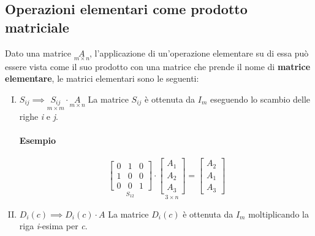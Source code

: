 		\subsection{Operazioni elementari come prodotto matriciale}
			Dato una matrice $ \underset{m \times n}{A} $, l'applicazione di un'operazione elementare su di essa può essere vista come il suo prodotto con una matrice che prende il nome di \textbf{matrice elementare}, le matrici elementari sono le seguenti:
			\begin{enumerate}[(I)]
				\item $ S_{ij} \implies \underset{m \times m}{S_{ij}} \cdot \underset{m \times n}{A} $ \newline
				La matrice $S_{ij}$ è ottenuta da $I_m$ eseguendo lo scambio delle righe \textit{i} e \textit{j}.
				\begin{GrayBox}
					\paragraph{Esempio}
					$$
					\underset{S_{12}}{\begin{bmatrix}
						0 & 1 & 0 \\
						1 & 0 & 0 \\
						0 & 0 & 1
					\end{bmatrix}}
					\cdot \underset{3 \times n}{\begin{bmatrix}
						A_1 \\
						A_2 \\
						A_3
					\end{bmatrix}} = \begin{bmatrix}
						A_2 \\
						A_1 \\
						A_3
					\end{bmatrix}
					$$
				\end{GrayBox}
				\item $ D_i(c) \implies D_i(c) \cdot A $ \newline
				La matrice $D_i(c)$ è ottenuta da $I_m$ moltiplicando la riga \textit{i}-esima per \textit{c}.	
				\begin{GrayBox}

\end{GrayBox}
\end{enumerate}
